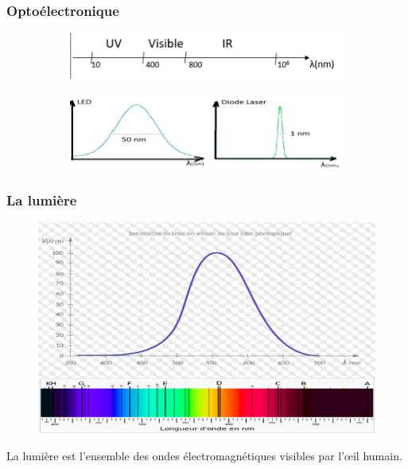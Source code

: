 \documentclass{article}
\begin{document}
            \subsubsection{Optoélectronique}
            \begin{figure}[H]
            \centering
                \begin{subfigure}[]{0.5\linewidth}
                    \includegraphics[width=\linewidth]{./images/016-optoelectronique.png}
                \end{subfigure}
                \begin{subfigure}[]{0.5\linewidth}
                    \includegraphics[width=\linewidth]{./images/017-optoelectronique.png}
                \end{subfigure}
            \end{figure}

            \subsubsection{La lumière}
            \begin{figure}[H]
            \centering
                \includegraphics[width=0.6\linewidth]{./images/018-lumiere.png}
            \end{figure}
            La lumière est l'ensemble des ondes électromagnétiques visibles par
            l'œil humain.
\end{document}
